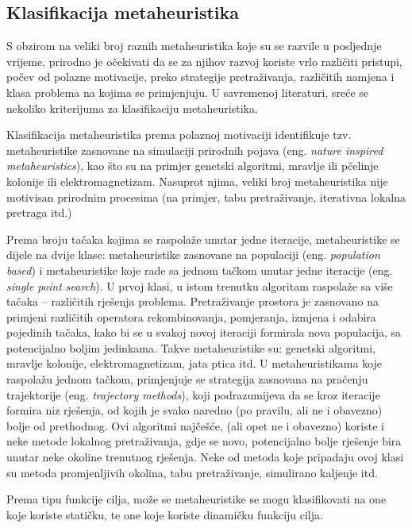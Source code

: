 \documentclass[a4paper, utf8, 11pt, colorlinks]{book}
\begin{document}
 \subsection{Klasifikacija metaheuristika}
 S obzirom na veliki broj raznih metaheuristika koje su se razvile u posljednje vrijeme, prirodno je očekivati da se za  njihov razvoj koriste vrlo različiti pristupi, počev od polazne motivacije, preko strategije pretraživanja, različitih namjena i klasa problema na kojima se primjenjuju.
 U savremenoj literaturi, sreće se nekoliko kriterijuma za klasifikaciju metaheuristika.
 
 Klasifikacija metaheuristika prema polaznoj motivaciji identifikuje tzv. metaheuristike zasnovane na simulaciji prirodnih pojava (eng. \emph{nature inspired metaheuristics}), kao što su na primjer genetski algoritmi, mravlje ili pčelinje kolonije ili elektromagnetizam. Nasuprot njima, veliki broj metaheuristika nije motivisan prirodnim procesima (na primjer, tabu pretraživanje, iterativna lokalna pretraga itd.)
 
 Prema broju tačaka kojima se raspolaže unutar jedne iteracije, metaheuristike se dijele na dvije klase: metaheuristike zasnovane na populaciji (eng. \emph{population based}) i metaheuristike koje rade sa jednom tačkom unutar jedne iteracije (eng. \emph{single point search}). U prvoj klasi, u istom trenutku algoritam raspolaže sa više tačaka -- različitih rješenja problema. Pretraživanje prostora je zasnovano na primjeni različitih operatora rekombinovanja, pomjeranja, izmjena i odabira pojedinih tačaka, kako bi se u svakoj novoj iteraciji formirala nova populacija, sa potencijalno boljim jedinkama. Takve metaheuristike su: genetski algoritmi, mravlje kolonije, elektromagnetizam, jata ptica itd.
 U metaheuristikama koje raspolažu jednom tačkom, primjenjuje se strategija zasnovana na praćenju trajektorije (eng. \emph{trajectory methods}), koji podrazumijeva da se kroz iteracije formira niz rješenja, od kojih je svako naredno (po pravilu, ali ne i obavezno) bolje od prethodnog. Ovi algoritmi najčešće, (ali opet ne i obavezno) koriste i neke metode lokalnog pretraživanja, gdje se novo, potencijalno bolje rješenje bira unutar neke okoline trenutnog rješenja. Neke od metoda koje pripadaju ovoj klasi su metoda promjenljivih okolina, tabu pretraživanje, simulirano kaljenje itd.
 
 Prema tipu funkcije cilja, može se  metaheuristike se mogu klasifikovati na one koje koriste statičku, te one koje koriste dinamičku funkciju cilja.
 
\end{document}
